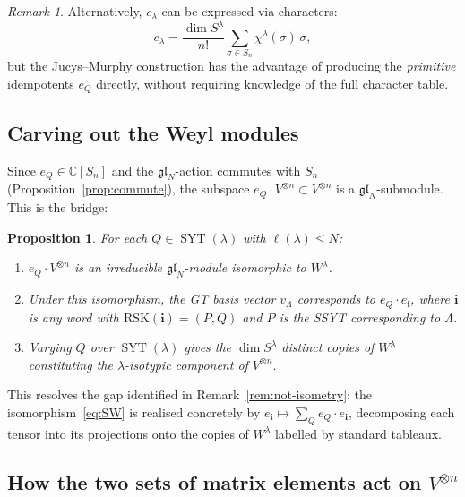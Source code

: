 \documentclass[12pt,a4paper]{article}
\newtheorem{proposition}[theorem]{Proposition}
\theoremstyle{definition}
\theoremstyle{remark}
\newtheorem{remark}[theorem]{Remark}
\newcommand{\C}{\mathbb{C}}
\newcommand{\gl}{\mathfrak{gl}}
\newcommand{\SYT}{\operatorname{SYT}}
\begin{document}
\begin{remark}
Alternatively, $c_\lambda$ can be expressed via characters:
\[
  c_\lambda = \frac{\dim S^\lambda}{n!}
  \sum_{\sigma \in S_n} \chi^\lambda(\sigma)\, \sigma,
\]
but the Jucys--Murphy construction has the advantage of producing the
\emph{primitive} idempotents $e_Q$ directly, without requiring knowledge
of the full character table.
\end{remark}

\subsection{Carving out the Weyl modules}

Since $e_Q \in \C[S_n]$ and the $\gl_N$-action commutes with $S_n$
(Proposition~\ref{prop:commute}), the subspace
$e_Q \cdot V^{\otimes n} \subset V^{\otimes n}$
is a $\gl_N$-submodule. This is the bridge:

\begin{proposition}\label{prop:JM-bridge}
For each $Q \in \SYT(\lambda)$ with $\ell(\lambda) \leqslant N$:
\begin{enumerate}[label=(\alph*)]
\item $e_Q \cdot V^{\otimes n}$ is an irreducible $\gl_N$-module
  isomorphic to $W^\lambda$.
\item Under this isomorphism, the GT basis vector $v_\Lambda$
  corresponds to $e_Q \cdot e_\mathbf{i}$, where $\mathbf{i}$ is any
  word with $\mathrm{RSK}(\mathbf{i}) = (P, Q)$ and $P$ is the SSYT
  corresponding to $\Lambda$.
\item Varying $Q$ over $\SYT(\lambda)$ gives the $\dim S^\lambda$
  distinct copies of $W^\lambda$ constituting the $\lambda$-isotypic
  component of $V^{\otimes n}$.
\end{enumerate}
\end{proposition}

This resolves the gap identified in Remark~\ref{rem:not-isometry}: the
isomorphism~\eqref{eq:SW} is realised concretely by $e_\mathbf{i}
\mapsto \sum_Q e_Q \cdot e_\mathbf{i}$, decomposing each tensor into
its projections onto the copies of $W^\lambda$ labelled by standard
tableaux.

\subsection{How the two sets of matrix elements act on $V^{\otimes n}$}
\end{document}
